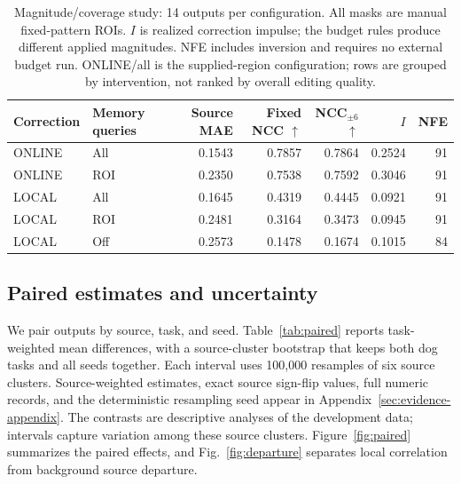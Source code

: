 \documentclass[conference]{IEEEtran}
\begin{document}
\begin{table}[t]
\centering\small
\caption{Magnitude/coverage study: 14 outputs per configuration. All masks are manual fixed-pattern ROIs. $I$ is realized correction impulse; the budget rules produce different applied magnitudes. NFE includes inversion and requires no external budget run. ONLINE/all is the supplied-region configuration; rows are grouped by intervention, not ranked by overall editing quality.}
\label{tab:r79}
\begin{tabular}{llrrrrr}
\toprule
Correction & Memory queries & Source MAE & Fixed NCC $\uparrow$ & NCC$_{\pm6}$ $\uparrow$ & $I$ & NFE\\
\midrule
ONLINE & All & 0.1543 & 0.7857 & 0.7864 & 0.2524 & 91\\
ONLINE & ROI & 0.2350 & 0.7538 & 0.7592 & 0.3046 & 91\\
LOCAL & All & 0.1645 & 0.4319 & 0.4445 & 0.0921 & 91\\
LOCAL & ROI & 0.2481 & 0.3164 & 0.3473 & 0.0945 & 91\\
LOCAL & Off & 0.2573 & 0.1478 & 0.1674 & 0.1015 & 84\\
\bottomrule
\end{tabular}
\end{table}
\subsection{Paired estimates and uncertainty}
We pair outputs by source, task, and seed. Table~\ref{tab:paired} reports task-weighted mean differences, with a source-cluster bootstrap that keeps both dog tasks and all seeds together. Each interval uses 100,000 resamples of six source clusters. Source-weighted estimates, exact source sign-flip values, full numeric records, and the deterministic resampling seed appear in Appendix~\ref{sec:evidence-appendix}. The contrasts are descriptive analyses of the development data; intervals capture variation among these source clusters. Figure~\ref{fig:paired} summarizes the paired effects, and Fig.~\ref{fig:departure} separates local correlation from background source departure.
\end{document}
